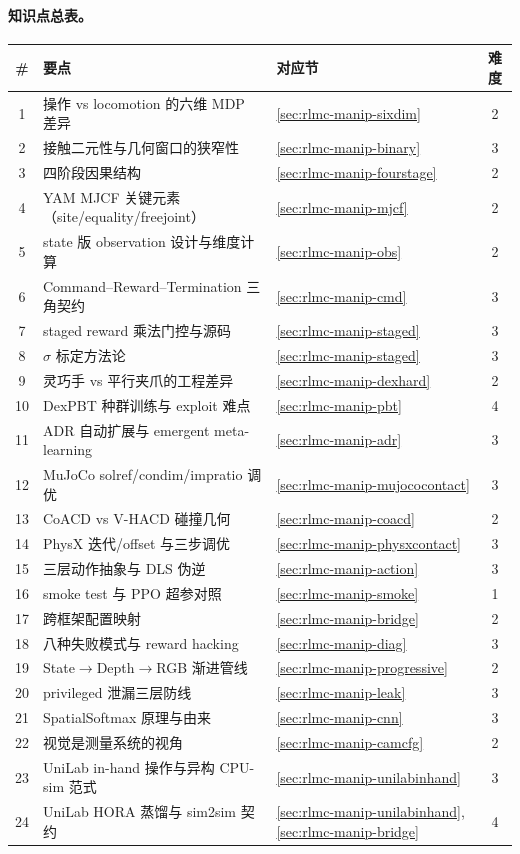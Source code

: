 \paragraph{知识点总表。}
\begin{center}
\small
\begin{tabular}{@{}cllc@{}}
\toprule
\# & 要点 & 对应节 & 难度 \\
\midrule
1 & 操作 vs locomotion 的六维 MDP 差异 & \cref{sec:rlmc-manip-sixdim} & 2 \\
2 & 接触二元性与几何窗口的狭窄性 & \cref{sec:rlmc-manip-binary} & 3 \\
3 & 四阶段因果结构 & \cref{sec:rlmc-manip-fourstage} & 2 \\
4 & YAM MJCF 关键元素（site/equality/freejoint） & \cref{sec:rlmc-manip-mjcf} & 2 \\
5 & state 版 observation 设计与维度计算 & \cref{sec:rlmc-manip-obs} & 2 \\
6 & Command--Reward--Termination 三角契约 & \cref{sec:rlmc-manip-cmd} & 3 \\
7 & staged reward 乘法门控与源码 & \cref{sec:rlmc-manip-staged} & 3 \\
8 & $\sigma$ 标定方法论 & \cref{sec:rlmc-manip-staged} & 3 \\
9 & 灵巧手 vs 平行夹爪的工程差异 & \cref{sec:rlmc-manip-dexhard} & 2 \\
10 & DexPBT 种群训练与 exploit 难点 & \cref{sec:rlmc-manip-pbt} & 4 \\
11 & ADR 自动扩展与 emergent meta-learning & \cref{sec:rlmc-manip-adr} & 3 \\
12 & MuJoCo solref/condim/impratio 调优 & \cref{sec:rlmc-manip-mujococontact} & 3 \\
13 & CoACD vs V-HACD 碰撞几何 & \cref{sec:rlmc-manip-coacd} & 2 \\
14 & PhysX 迭代/offset 与三步调优 & \cref{sec:rlmc-manip-physxcontact} & 3 \\
15 & 三层动作抽象与 DLS 伪逆 & \cref{sec:rlmc-manip-action} & 3 \\
16 & smoke test 与 PPO 超参对照 & \cref{sec:rlmc-manip-smoke} & 1 \\
17 & 跨框架配置映射 & \cref{sec:rlmc-manip-bridge} & 2 \\
18 & 八种失败模式与 reward hacking & \cref{sec:rlmc-manip-diag} & 3 \\
19 & State$\to$Depth$\to$RGB 渐进管线 & \cref{sec:rlmc-manip-progressive} & 2 \\
20 & privileged 泄漏三层防线 & \cref{sec:rlmc-manip-leak} & 3 \\
21 & SpatialSoftmax 原理与由来 & \cref{sec:rlmc-manip-cnn} & 3 \\
22 & 视觉是测量系统的视角 & \cref{sec:rlmc-manip-camcfg} & 2 \\
23 & UniLab in-hand 操作与异构 CPU-sim 范式 & \cref{sec:rlmc-manip-unilabinhand} & 3 \\
24 & UniLab HORA 蒸馏与 sim2sim 契约 & \cref{sec:rlmc-manip-unilabinhand}, \cref{sec:rlmc-manip-bridge} & 4 \\
\bottomrule
\end{tabular}
\end{center}

